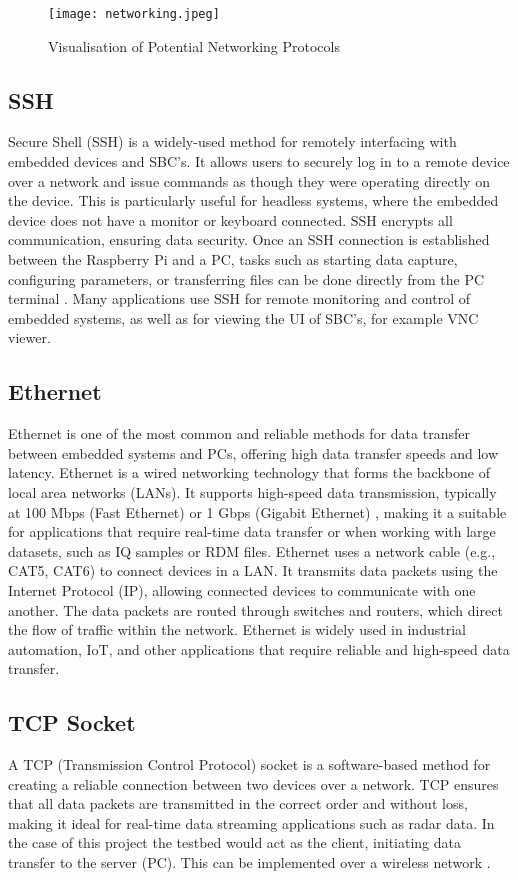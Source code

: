 \begin{figure}[htbp]
    \centering
    \texttt{[image: networking.jpeg]}
    \caption{Visualisation of Potential Networking Protocols}
    \label{fig:NetworkingOverview}
\end{figure}

\subsection{SSH}
Secure Shell (SSH) is a widely-used method for remotely interfacing with embedded devices and SBC's. It allows users to securely log in to a remote device over a network and issue commands as though they were operating directly on the device. This is particularly useful for headless systems, where the embedded device does not have a monitor or keyboard connected. SSH encrypts all communication, ensuring data security. Once an SSH connection is established between the Raspberry Pi and a PC, tasks such as starting data capture, configuring parameters, or transferring files can be done directly from the PC terminal \cite{SSHOverview}. Many applications use SSH for remote monitoring and control of embedded systems, as well as for viewing the UI of SBC's, for example VNC viewer.


\subsection{Ethernet}
Ethernet is one of the most common and reliable methods for data transfer between embedded systems and PCs, offering high data transfer speeds and low latency. Ethernet is a wired networking technology that forms the backbone of local area networks (LANs). It supports high-speed data transmission, typically at 100 Mbps (Fast Ethernet) or 1 Gbps (Gigabit Ethernet) \cite{rpi5_wifi}, making it a suitable for applications that require real-time data transfer or when working with large datasets, such as IQ samples or RDM files. Ethernet uses a network cable (e.g., CAT5, CAT6) to connect devices in a LAN. It transmits data packets using the Internet Protocol (IP), allowing connected devices to communicate with one another. The data packets are routed through switches and routers, which direct the flow of traffic within the network. Ethernet is widely used in industrial automation, IoT, and other applications that require reliable and high-speed data transfer.

\subsection{TCP Socket}
A TCP (Transmission Control Protocol) socket is a software-based method for creating a reliable connection between two devices over a network. TCP ensures that all data packets are transmitted in the correct order and without loss, making it ideal for real-time data streaming applications such as radar data. In the case of this project the testbed would act as the client, initiating data transfer to the server (PC). This can be implemented over a wireless network \cite{TCPoverview}.

